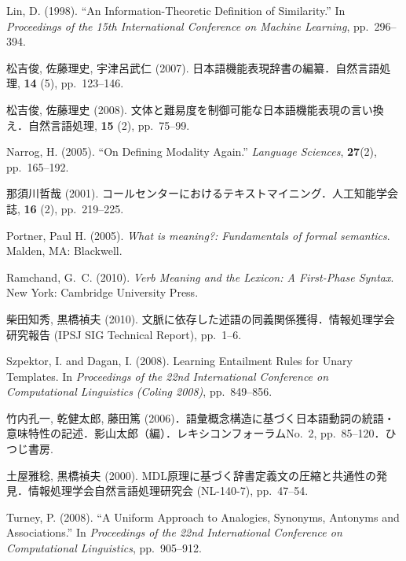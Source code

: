 \documentclass[japanese]{jnlp_1.4}
\begin{document}
\begin{thebibliography}{}
\item
Lin, D. (1998). ``An Information-Theoretic Definition of Similarity.'' In 
\textit{Proceedings of the 15th International Conference on Machine Learning}, pp.~296--394.

\item
松吉俊, 佐藤理史, 宇津呂武仁 (2007). 日本語機能表現辞書の編纂．自然言語処理, 
\textbf{14} (5), pp.~123--146.

\item
松吉俊, 佐藤理史 (2008). 
文体と難易度を制御可能な日本語機能表現の言い換え．自然言語処理, \textbf{15} 
(2), pp.~75--99.

\item
Narrog, H. (2005). ``On Defining Modality Again.'' \textit{Language Sciences}, \textbf{27}(2), pp.~165--192.

\item
那須川哲哉 (2001). コールセンターにおけるテキストマイニング．人工知能学会誌, 
\textbf{16} (2), pp.~219--225.

\item
Portner, Paul H. (2005). \textit{What is meaning?: Fundamentals of formal semantics}. Malden, MA: Blackwell.

\item
Ramchand, G.~C. (2010). \textit{Verb Meaning and the Lexicon: A First-Phase Syntax}. New York: Cambridge University Press.

\item
柴田知秀, 黒橋禎夫 (2010). 
文脈に依存した述語の同義関係獲得．情報処理学会研究報告 (IPSJ SIG Technical Report), pp.~1--6.

\item
Szpektor, I. and Dagan, I. (2008). Learning Entailment Rules for Unary 
Templates. In \textit{Proceedings of the 22nd International Conference on Computational Linguistics (Coling 2008)}, pp.~849--856.

\item
竹内孔一, 乾健太郎, 
藤田篤 (2006)．語彙概念構造に基づく日本語動詞の統語・意味特性の記述．影山太郎（編）．レキシコンフォーラムNo.~2, 
pp.~85--120．ひつじ書房.

\item
土屋雅稔, 黒橋禎夫 (2000). 
MDL原理に基づく辞書定義文の圧縮と共通性の発見．情報処理学会自然言語処理研究会 (NL-140-7), 
pp.~47--54. 

\item
Turney, P. (2008). ``A Uniform Approach to Analogies, Synonyms, Antonyms and 
Associations.'' In \textit{Proceedings of the 22nd International Conference on Computational Linguistics}, pp.~905--912.


\end{thebibliography}
\end{document}
